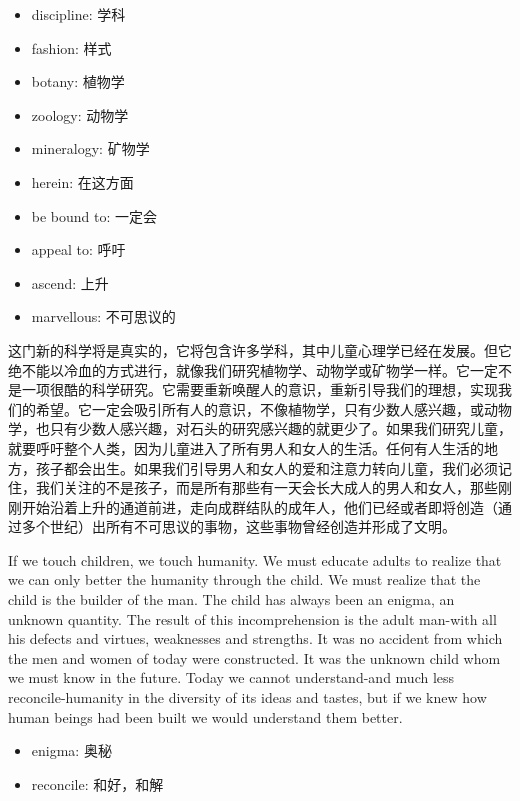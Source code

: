 \documentclass[lang=cn,10pt]{elegantbook}
\begin{document}
\begin{tcolorbox}
    \begin{itemize}
        \item discipline: 学科
        \item fashion: 样式
        \item botany: 植物学
        \item zoology: 动物学
        \item mineralogy: 矿物学
        \item herein: 在这方面
        \item be bound to: 一定会
        \item appeal to: 呼吁
        \item ascend: 上升
        \item marvellous: 不可思议的
    \end{itemize}
\end{tcolorbox}

这门新的科学将是真实的，它将包含许多学科，其中儿童心理学已经在发展。但它绝不能以冷血的方式进行，就像我们研究植物学、动物学或矿物学一样。它一定不是一项很酷的科学研究。它需要重新唤醒人的意识，重新引导我们的理想，实现我们的希望。它一定会吸引所有人的意识，不像植物学，只有少数人感兴趣，或动物学，也只有少数人感兴趣，对石头的研究感兴趣的就更少了。如果我们研究儿童，就要呼吁整个人类，因为儿童进入了所有男人和女人的生活。任何有人生活的地方，孩子都会出生。如果我们引导男人和女人的爱和注意力转向儿童，我们必须记住，我们关注的不是孩子，而是所有那些有一天会长大成人的男人和女人，那些刚刚开始沿着上升的通道前进，走向成群结队的成年人，他们已经或者即将创造（通过多个世纪）出所有不可思议的事物，这些事物曾经创造并形成了文明。

If we touch children, we touch humanity. We must educate adults to realize that we can only better the humanity through the child. We must realize that the child is the builder of the man. The child has always been an enigma, an unknown quantity. The result of this incomprehension is the adult man-with all his defects and virtues, weaknesses and strengths. It was no accident from which the men and women of today were constructed. It was the unknown child whom we must know in the future. Today we cannot understand-and much less reconcile-humanity in the diversity of its ideas and tastes, but if we knew how human beings had been built we would understand them better.

\begin{tcolorbox}
    \begin{itemize}
        \item enigma: 奥秘
        \item reconcile: 和好，和解
    \end{itemize}
\end{tcolorbox}
\end{document}
